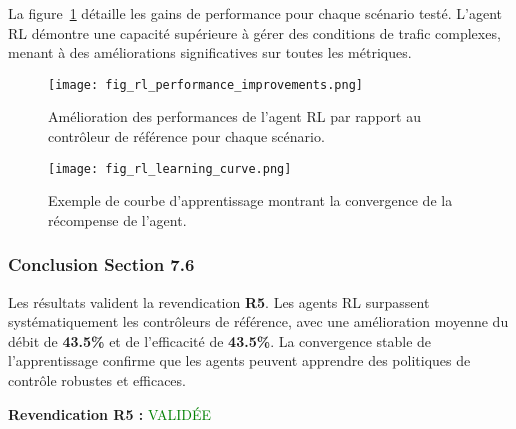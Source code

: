 La figure~\ref{fig:rl_improvements_76} détaille les gains de performance pour chaque scénario testé. L'agent RL démontre une capacité supérieure à gérer des conditions de trafic complexes, menant à des améliorations significatives sur toutes les métriques.

\begin{figure}[h!]
  \centering
  \texttt{[image: fig\_rl\_performance\_improvements.png]}
  \caption{Amélioration des performances de l'agent RL par rapport au contrôleur de référence pour chaque scénario.}
  \label{fig:rl_improvements_76}
\end{figure}

\begin{figure}[h!]
  \centering
  \texttt{[image: fig\_rl\_learning\_curve.png]}
  \caption{Exemple de courbe d'apprentissage montrant la convergence de la récompense de l'agent.}
  \label{fig:rl_learning_curve_76}
\end{figure}

\subsubsection{Conclusion Section 7.6}
Les résultats valident la revendication \textbf{R5}. Les agents RL surpassent systématiquement les contrôleurs de référence, avec une amélioration moyenne du débit de \textbf{43.5\%} et de l'efficacité de \textbf{43.5\%}. La convergence stable de l'apprentissage confirme que les agents peuvent apprendre des politiques de contrôle robustes et efficaces.

\vspace{0.5cm}
\noindent\textbf{Revendication R5 : }\textcolor{green}{VALIDÉE}
